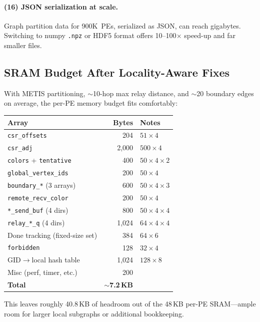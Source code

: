 \documentclass[11pt,letterpaper]{article}
\begin{document}
\paragraph{(16) JSON serialization at scale.}
Graph partition data for 900K~PEs, serialized as JSON,
can reach gigabytes.
Switching to numpy \texttt{.npz} or HDF5 format
offers 10--100$\times$ speed-up and far smaller files.

\subsection{SRAM Budget After Locality-Aware Fixes}

With METIS partitioning, $\sim$10-hop max relay distance,
and $\sim$20 boundary edges on average, the per-PE memory budget fits comfortably:

\begin{center}
\renewcommand{\arraystretch}{1.2}
\begin{tabular}{lrl}
\toprule
\textbf{Array} & \textbf{Bytes} & \textbf{Notes} \\
\midrule
\texttt{csr\_offsets} & 204 & $51 \times 4$ \\
\texttt{csr\_adj} & 2{,}000 & $500 \times 4$ \\
\texttt{colors} + \texttt{tentative} & 400 & $50 \times 4 \times 2$ \\
\texttt{global\_vertex\_ids} & 200 & $50 \times 4$ \\
\texttt{boundary\_*} (3 arrays) & 600 & $50 \times 4 \times 3$ \\
\texttt{remote\_recv\_color} & 200 & $50 \times 4$ \\
\texttt{*\_send\_buf} (4 dirs) & 800 & $50 \times 4 \times 4$ \\
\texttt{relay\_*\_q} (4 dirs) & 1{,}024 & $64 \times 4 \times 4$ \\
Done tracking (fixed-size set) & 384 & $64 \times 6$ \\
\texttt{forbidden} & 128 & $32 \times 4$ \\
GID$\to$local hash table & 1{,}024 & $128 \times 8$ \\
Misc (perf, timer, etc.) & 200 & \\
\midrule
\textbf{Total} & \textbf{$\sim$7.2\,KB} & \\
\bottomrule
\end{tabular}
\end{center}

This leaves roughly 40.8\,KB of headroom out of the 48\,KB per-PE SRAM---ample
room for larger local subgraphs or additional bookkeeping.
\end{document}
